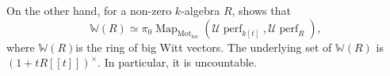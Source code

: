 \documentclass{article}
\theoremstyle{definition}
\newcommand{\on}{\operatorname}
\begin{document}
On the other hand, for a non-zero $k$-algebra $R$, \cite[Theorem 9.1]{Efi25} shows that\[
\mathbb{W}(R)\simeq\pi_0\on{Map}_{\on{Mot}_{\on{loc}}}(\mathcal{U}\on{perf}_{k[t]},\mathcal{U}\on{perf}_R),\]
where $\mathbb{W}(R)$is the ring of big Witt vectors. The underlying set of $\mathbb{W}(R)$ is $(1+tR[[t]])^\times$. In particular, it is uncountable.


\end{document}
